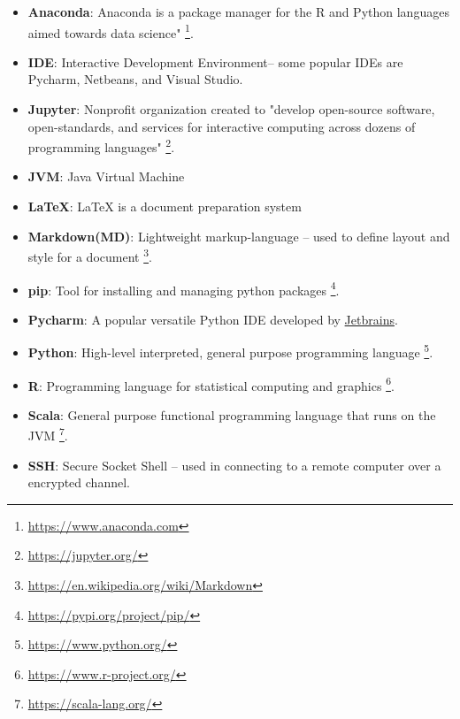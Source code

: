 \documentclass[pdftex,12pt]{artikel3}
\begin{document}
\begin{itemize}[label={}]
\item {\bf Anaconda}: Anaconda is a package manager for the R and Python languages aimed towards data science" \footnote{\url{ https://www.anaconda.com}}.\\
\item {\bf IDE}: Interactive Development Environment-- some popular IDEs are Pycharm, Netbeans, and Visual Studio.\\
\item {\bf Jupyter}: Nonprofit organization created to "develop open-source software, open-standards, and services for interactive computing across dozens of programming languages" \footnote{\url{ https://jupyter.org/}}.\\
\item {\bf JVM}: Java Virtual Machine\\
\item {\bf LaTeX}: LaTeX is a document preparation system\\
\item {\bf Markdown(MD)}: Lightweight markup-language -- used to define layout and style for a document  \footnote{\url{https://en.wikipedia.org/wiki/Markdown}}.\\
\item {\bf pip}: Tool for installing and managing python packages \footnote{\url{ https://pypi.org/project/pip/}}.\\
\item {\bf Pycharm}: A popular versatile Python IDE developed by \href{https://www.jetbrains.com/}{Jetbrains}.\\
\item {\bf Python}: High-level interpreted, general purpose programming language \footnote{\url{ https://www.python.org/}}.\\
\item {\bf R}: Programming language for statistical computing and graphics \footnote{\url{ https://www.r-project.org/}}.\\
\item {\bf Scala}: General purpose functional programming language that runs on the JVM \footnote{\url{ https://scala-lang.org/}}.\\
\item {\bf SSH}: Secure Socket Shell -- used in connecting to a remote computer over a encrypted channel.\\

\end{itemize}
\end{document}
